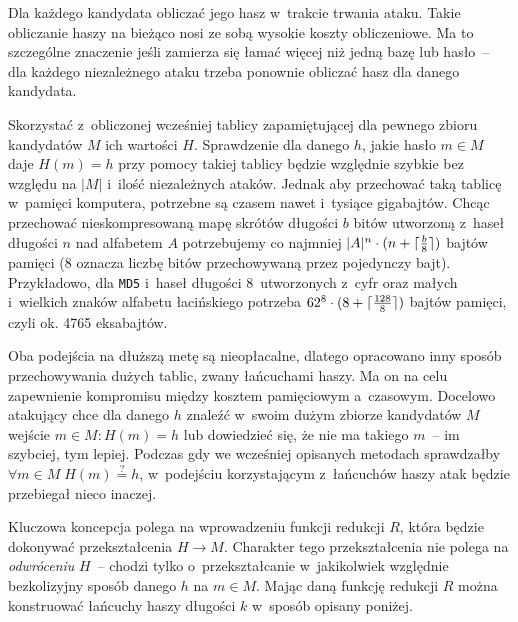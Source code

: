 \begin{myenumerate}

    \item Dla każdego kandydata obliczać jego hasz w~trakcie trwania ataku.
    Takie obliczanie haszy na bieżąco nosi ze sobą wysokie koszty obliczeniowe.
    Ma to szczególne znaczenie jeśli zamierza się łamać więcej niż jedną bazę
    lub hasło~-- dla każdego niezależnego ataku trzeba ponownie obliczać hasz
    dla danego kandydata.

    \item Skorzystać z~obliczonej wcześniej tablicy zapamiętującej dla pewnego
    zbioru kandydatów $M$ ich wartości $H$. Sprawdzenie dla danego $h$, jakie
    hasło $m \in M$ daje $H(m) = h$ przy pomocy takiej tablicy będzie względnie
    szybkie bez względu na $|M|$ i~ilość niezależnych ataków. Jednak aby
    przechować taką tablicę w~pamięci komputera, potrzebne są czasem nawet
    i~tysiące gigabajtów. Chcąc przechować nieskompresowaną mapę skrótów
    długości $b$ bitów utworzoną z~haseł długości $n$ nad alfabetem $A$
    potrzebujemy co najmniej $|A|^n \cdot (n + \lceil\frac{b}{8}\rceil)$ bajtów
    pamięci (8 oznacza liczbę bitów przechowywaną przez pojedynczy bajt).
    Przykładowo, dla \texttt{MD5} i~haseł długości 8~utworzonych z~cyfr oraz
    małych i~wielkich znaków alfabetu łacińskiego potrzeba $62^8 \cdot (8 +
    \lceil\frac{128}{8}\rceil)$ bajtów pamięci, czyli ok. 4765 eksabajtów.

\end{myenumerate}

Oba podejścia na dłuższą metę są nieopłacalne, dlatego opracowano inny sposób
przechowywania dużych tablic, zwany łańcuchami haszy. Ma on na celu zapewnienie
kompromisu między kosztem pamięciowym a~czasowym. Docelowo atakujący chce dla
danego $h$ znaleźć w~swoim dużym zbiorze kandydatów $M$ wejście $m \in M : H(m)
= h$ lub dowiedzieć się, że nie ma takiego $m$~-- im szybciej, tym lepiej.
Podczas gdy we wcześniej opisanych metodach sprawdzałby $\forall m \in M \;
H(m) \stackrel{?}{=} h$, w~podejściu korzystającym z~łańcuchów haszy atak
będzie przebiegał nieco inaczej.

Kluczowa koncepcja polega na wprowadzeniu funkcji redukcji $R$, która będzie
dokonywać przekształcenia $H \to M$. Charakter tego przekształcenia nie polega
na \emph{odwróceniu} $H$~-- chodzi tylko o~przekształcanie w~jakikolwiek
względnie bezkolizyjny sposób danego $h$ na $m \in M$. Mając daną funkcję
redukcji $R$ można konstruować łańcuchy haszy długości $k$ w~sposób opisany
poniżej.

